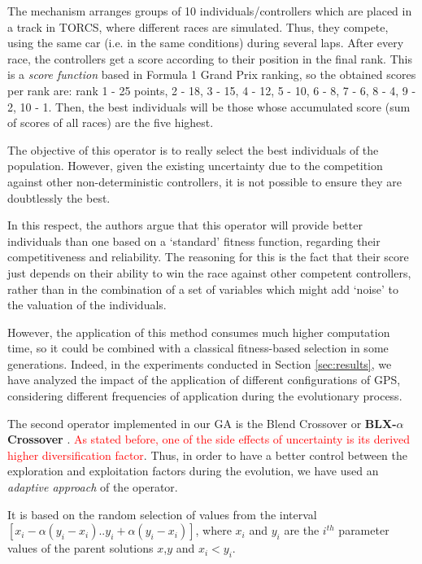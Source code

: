 \documentclass[10pt,journal,compsoc]{IEEEtran}
\begin{document}
The mechanism arranges groups of 10 individuals/controllers which are placed in a track in TORCS, where different races are simulated. Thus, they compete, using the same car (i.e. in the same conditions) during several laps. After every race, the controllers get a score according to their position in the final rank. This is a \textit{score function} based in Formula 1 Grand Prix ranking, so the obtained scores per rank are: rank 1 - 25 points, 2 - 18, 3 - 15, 4 - 12, 5 - 10, 6 - 8, 7 - 6, 8 - 4, 9 - 2, 10 - 1.
Then, the best individuals will be those whose accumulated score (sum of scores of all races) are the five highest.

The objective of this operator is to really select the best
individuals of the population. However, given the existing uncertainty
\cite{merelo2016statistical} due to the competition against other
non-deterministic controllers, it is not possible to ensure they are
doubtlessly the best. 

In this respect, the authors argue that this operator will provide better individuals than one based on a `standard' fitness function, regarding their competitiveness and reliability. The reasoning for this is the fact that their score just depends on their ability to win the race against other competent controllers, rather than in the combination of a set of variables which might add `noise' to the valuation of the individuals.

However, the application of this method consumes much higher computation time, so it could be combined with a classical fitness-based selection in some generations. Indeed, in the experiments conducted in Section \ref{sec:results}, we have analyzed the impact of the application of different configurations of GPS, considering different frequencies of application during the evolutionary process.

The second operator implemented in our GA is the Blend Crossover or  \textbf{BLX-$\alpha$ Crossover} \cite{blx2008}. \textcolor{red}{As stated before, one of the side effects of uncertainty is its derived higher diversification factor}. Thus, in order to have a better control between the exploration and exploitation factors during the evolution, we have used an \textit{adaptive approach} of the operator.

It is based on the random selection of values from the interval
$[x_i-\alpha(y_i-x_i).. y_i+\alpha(y_i-x_i)]$, where $x_i$ and $y_i$
are the $i^{th}$ parameter values of the parent solutions $x$,$y$ and
$x_i < y_i$. %
\end{document}
